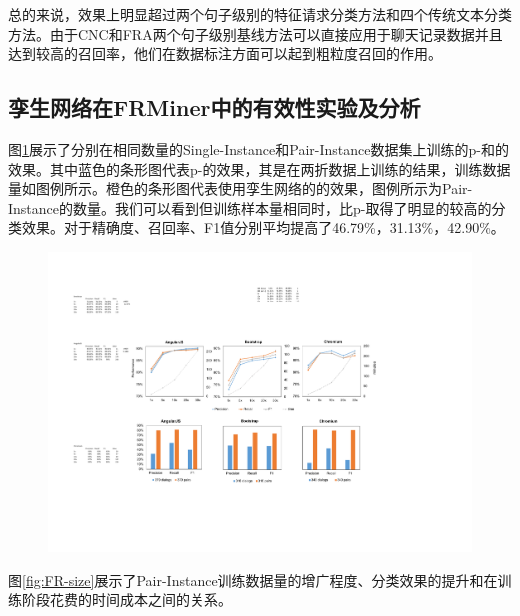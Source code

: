 总的来说，{\tool}效果上明显超过两个句子级别的特征请求分类方法和四个传统文本分类方法。由于CNC和FRA两个句子级别基线方法可以直接应用于聊天记录数据并且达到较高的召回率，他们在数据标注方面可以起到粗粒度召回的作用。

\subsection{孪生网络在FRMiner中的有效性实验及分析}

图\ref{fig:p-FR}展示了分别在相同数量的Single-Instance和Pair-Instance数据集上训练的p-{\tool}和{\tool}的效果。其中蓝色的条形图代表p-{\tool}的效果，其是在两折数据上训练的结果，训练数据量如图例所示。橙色的条形图代表使用孪生网络的{\tool}的效果，图例所示为Pair-Instance的数量。我们可以看到但训练样本量相同时，{\tool}比p-{\tool}取得了明显的较高的分类效果。{\tool}对于精确度、召回率、F1值分别平均提高了46.79\%，31.13\%，42.90\%。

\begin{figure}[htb]
\centering
\includegraphics[width=\textwidth]{Img/p-FRvsFR.pdf}
\label{fig:p-FR}
\end{figure} 

图\ref{fig:FR-size}展示了Pair-Instance训练数据量的增广程度、分类效果的提升和在训练阶段花费的时间成本之间的关系。

